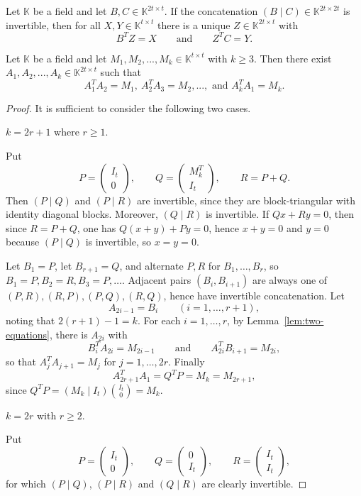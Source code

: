 \documentclass[10pt,a4paper]{amsart}
\newcommand{\K}{\mathbb{K}}
\begin{document}
\begin{lemma}\label{lem:two-equations}
Let $\K$ be a field and let $B,C\in \K^{2t\times t}$.
If the concatenation $(B\mid C)\in \K^{2t\times2t}$ is invertible, then for all $X,Y\in \K^{t\times t}$ there is a unique $Z\in \K^{2t\times t}$ with
\[
  B^T Z=X
  \qquad\text{and}\qquad
  Z^T C=Y.
\]
\end{lemma}

\begin{lemma}\label{lem:mat}
    Let $\K$ be a field and let $M_1,M_2,...,M_k\in \K^{t\times t}$ with $k\ge 3$. Then there exist  $A_1, A_2,...,A_k\in \K^{2t\times t}$ such that 
    $$
    A_1^TA_2=M_1,~ A_2^TA_3=M_2,...,\text{ and } A_k^TA_1=M_k.
    $$
\end{lemma}

\begin{proof}

It is sufficient to consider the following two cases. 
\medskip

 $k=2r+1$ where $r\ge1$.  

Put
\[
  P=\begin{pmatrix}I_t\\0\end{pmatrix},
  \qquad
  Q=\begin{pmatrix}M_k^T\\I_t\end{pmatrix},
  \qquad
  R=P+Q.
\]
Then $(P\mid Q)$ and $(P\mid R)$  are   invertible, since they are block-triangular with identity diagonal blocks. Moreover,   $(Q\mid R)$ is invertible. If $Qx+Ry=0$, then  since $R=P+Q$, one has
$Q(x+y)+Py=0$, hence $x+y=0$ and $y=0$ because $(P\mid Q)$ is invertible, so $x=y=0$.

Let $B_1=P$, let $B_{r+1}=Q$, and alternate $P,R$ for $B_1,
\ldots,B_r$, so $B_1=P,B_2=R,B_3=P,\ldots$.
Adjacent pairs $(B_i,B_{i+1})$ are always one of
$(P,R),(R,P),(P,Q),(R,Q)$, hence have invertible concatenation.
Let 
\[
  A_{2i-1}=B_i\qquad (i=1,\ldots,r+1),
\]
noting that $2(r+1)-1=k$.
For each $i=1,\ldots,r$, by Lemma~\ref{lem:two-equations}, there is  $A_{2i}$ with
\[
  B_i^T A_{2i}=M_{2i-1}
  \qquad\text{and}\qquad
  A_{2i}^T B_{i+1}=M_{2i},
\]
so that $A_j^T A_{j+1}=M_j$ for $j=1,\ldots,2r$.
Finally
\[
  A_{2r+1}^T A_1=Q^TP=M_k=M_{2r+1},
\]
since $Q^TP=(M_k\mid I_t)\binom{I_t}{0}=M_k$.


\medskip

 $k=2r$ with $r\ge2$.

Put
\[
  P=\begin{pmatrix}I_t\\0\end{pmatrix},
  \qquad
  Q=\begin{pmatrix}0\\I_t\end{pmatrix},
  \qquad
  R=\begin{pmatrix}I_t\\I_t\end{pmatrix},
\]
for which $(P\mid Q)$, $(P\mid R)$ and $(Q\mid R)$ are clearly invertible.



\end{proof}
\end{document}

